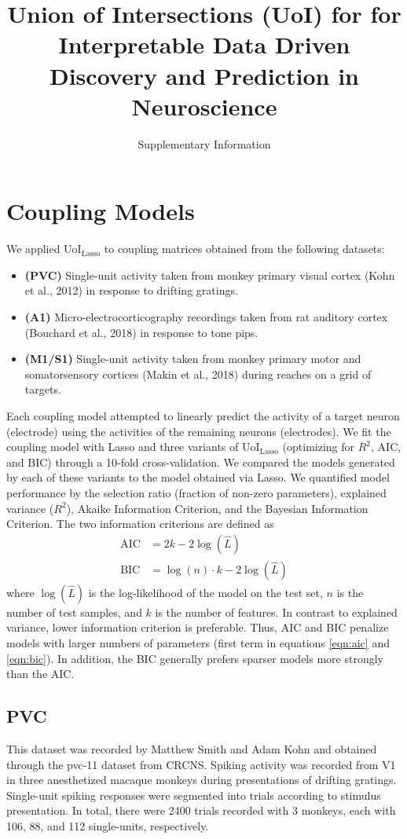 \documentclass[11pt]{article}
\title{\textbf{Union of Intersections (UoI) for for Interpretable Data Driven Discovery and Prediction in Neuroscience}}
\author{\Large Supplementary Information}
\date{}
\begin{document}
\thispagestyle{empty}
\maketitle
\section{Coupling Models}
We applied UoI$_{\text{Lasso}}$ to coupling matrices obtained from the following datasets:
\begin{itemize}
	\item \textbf{(PVC)} Single-unit activity taken from monkey primary visual cortex (Kohn et al., 2012) in response to drifting gratings.
	\item \textbf{(A1)} Micro-electrocorticography recordings taken from rat auditory cortex (Bouchard et al., 2018) in response to tone pips.
	\item \textbf{(M1/S1)} Single-unit activity taken from monkey primary motor and somatorsensory cortices (Makin et al., 2018) during reaches on a grid of targets.
\end{itemize}

Each coupling model attempted to linearly predict the activity of a target neuron (electrode) using the activities of the remaining neurons (electrodes). We fit the coupling model with Lasso and three variants of UoI$_{\text{Lasso}}$ (optimizing for $R^2$, AIC, and BIC) through a 10-fold cross-validation. We compared the models generated by each of these variants to the model obtained via Lasso. We quantified model performance by the selection ratio (fraction of non-zero parameters), explained variance ($R^2$), Akaike Information Criterion, and the Bayesian Information Criterion. The two information criterions are defined as
\begin{align}
	\text{AIC} &= 2k - 2 \log(\hat{L}) \label{eqn:aic}\\
	\text{BIC} &= \log(n) \cdot k - 2 \log(\hat{L}) \label{eqn:bic}
\end{align}
where $\log(\hat{L})$ is the log-likelihood of the model on the test set, $n$ is the number of test samples, and $k$ is the number of features. In contrast to explained variance, lower information criterion is preferable. Thus, AIC and BIC penalize models with larger numbers of parameters (first term in equations \ref{eqn:aic} and \ref{eqn:bic}). In addition, the BIC generally prefers sparser models more strongly than the AIC.
\subsection{PVC}
This dataset was recorded by Matthew Smith and Adam Kohn and obtained through the pvc-11 dataset from CRCNS. Spiking activity was recorded from V1 in three anesthetized macaque monkeys during presentations of drifting gratings. Single-unit spiking responses were segmented into trials according to stimulus presentation. In total, there were 2400 trials recorded with 3 monkeys, each with 106, 88, and 112 single-units, respectively.
\end{document}
